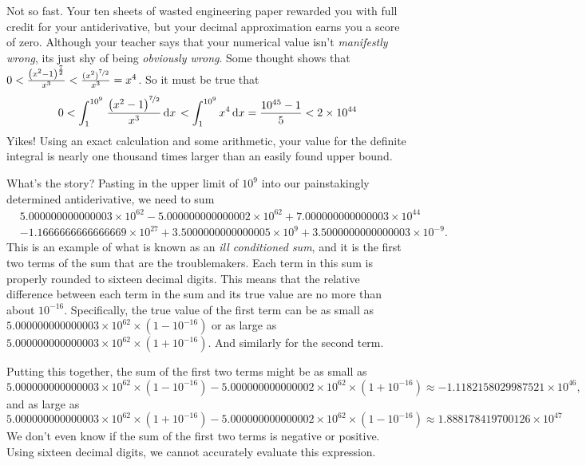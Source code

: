 \documentclass[12pt,fleqn]{article}
\newcounter{ex}\setcounter{ex}{0}
\begin{document}
Not so fast. Your ten sheets of wasted engineering paper rewarded
you with full credit for your antiderivative, but your
decimal approximation earns you a score of zero. Although your teacher says that 
your numerical value isn't \emph{manifestly wrong}, its 
just shy of being \emph{obviously wrong}. Some thought 
shows that $0 < \frac{{{\left( {{x}^{2}}-1\right) }^{\frac{7}{2}}}}{{{x}^{3}}}
< \frac{(x^2)^{\nicefrac{7}{2}}} {x^3} = x^4$. So it must be true that
\begin{equation*}
   0 <  \int_1^{10^9} {\left. \frac{{{\left( {{x}^{2}}-1\right) }^{\nicefrac{7}{2}}}}{{{x}^{3}}} \, \mathrm{d}x\right.}
       < \int_1^{10^9} x^4 \, \mathrm{d}x =  \frac{10^{45} - 1 }{5} < 2  \times 10^{44}
\end{equation*}
Yikes! Using an exact calculation and some arithmetic, your value 
for the definite integral is nearly one thousand times larger than
an easily found upper bound.

What's the story?  Pasting in the upper limit of $10^9$ into our 
painstakingly determined antiderivative, we need to sum
\begin{align*}
&5.000000000000003 \times  {{10}^{62}} - 5.000000000000002  \times 
{{10}^{62}} + 7.000000000000003 \times {{10}^{44}}  \\
&-1.1666666666666669 \times {{10}^{27}} + 
3.5000000000000005 \times {{10}^{9}} + 3.5000000000000003 \times {{10}^{-9}}.
\end{align*}
This is an example of what is known as an \emph{ill conditioned sum}, and 
it is the first two terms of the sum that are the 
troublemakers. Each term in this sum is properly rounded to sixteen 
decimal digits. This means that the relative difference between 
each term in the sum and its true value are no more than about 
$10^{-16}$. Specifically, the true value of the first term 
can be as small as $5.000000000000003 \times  {{10}^{62}} \times
(1 - 10^{-16})$ or as large as $5.000000000000003 \times  {{10}^{62}} 
\times (1 + 10^{-16})$. And similarly for the second term.

Putting this together, the sum of the first two terms might be as small
as 
\begin{equation*}
  5.000000000000003 \times 10^{62} \times (1 -  10^{-16}) - 5
   .000000000000002 \times 10^{62} \times  (1  + 10^{-16})
   \approx -1.1182158029987521 \times 10^{46},
\end{equation*}
and as large as 
\begin{equation*}
  5.000000000000003 \times 10^{62} \times (1 + 10^{-16}) - 5
   .000000000000002 \times 10^{62} \times  (1  - 10^{-16})
   \approx 1.888178419700126 \times {{10}^{47}}
\end{equation*}
We don't even know if the sum of the first two terms is negative 
or positive.  Using sixteen decimal digits, we cannot accurately
evaluate this expression.
\end{document}

